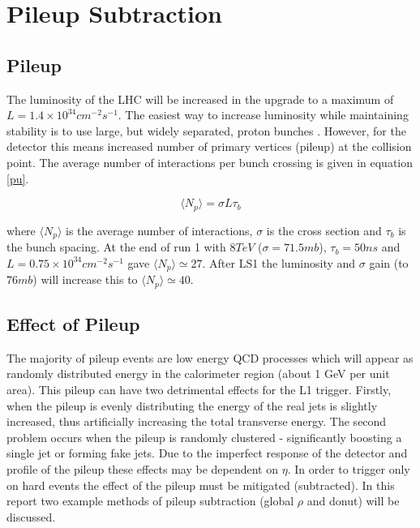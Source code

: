 \section{Pileup Subtraction}
\subsection{Pileup}

The luminosity of the LHC will be increased in the upgrade to a maximum of 
$L = 1.4\times10^{34} cm^{-2}s^{-1}$. The easiest way to increase luminosity while maintaining stability is to 
use large, but widely separated, proton bunches \cite{PUform}. However, for the detector this means increased 
number of primary vertices (pileup) at the collision point. The average number of interactions per 
bunch crossing is given in equation \ref{pu}.

\begin{equation}
\langle N_p \rangle = \sigma L 
\tau_b
\label{pu}
\end{equation}

where $\langle N_p \rangle$ is the average number of interactions, $\sigma$ 
is the cross section and $\tau_b$ is the bunch spacing. At the end of run 
1 with $8 TeV$ ($\sigma = 71.5mb$), $\tau_b = 50ns$ and $L = 0.75\times10^{34} cm^{-2}s^{-1}$ 
gave $\langle N_p \rangle\simeq27$. After LS1 the luminosity and $\sigma$ gain (to $76mb$) will increase 
this to $\langle N_p \rangle\simeq40$. 
\subsection{Effect of Pileup}
The majority of pileup events are low 
energy QCD processes which will appear as randomly distributed energy in the calorimeter region (about 
1 GeV per unit area). This pileup can have two detrimental effects for the L1 
trigger. Firstly, when the pileup is evenly distributing the energy of the real jets is 
slightly increased, thus artificially increasing the total transverse energy. The second problem occurs when the 
pileup is randomly clustered - significantly boosting a single jet or forming fake jets. Due 
to the imperfect response of the detector and profile of the pileup these effects may 
be dependent on $\eta$. In order to trigger only on hard events the effect of 
the pileup must be mitigated (subtracted). In this report two example methods of pileup subtraction 
(global $\rho$ and donut) will be discussed.

